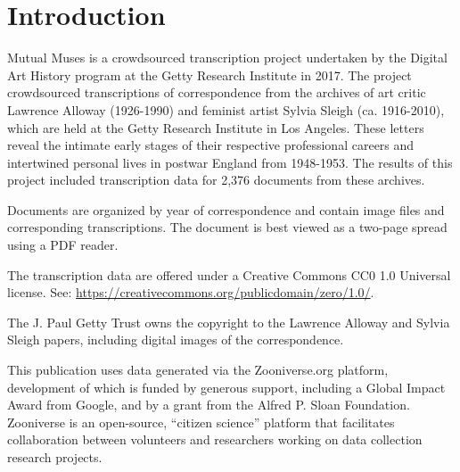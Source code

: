 \makeatletter
\renewcommand*\cleardoublepage{\clearpage\if@twoside
  \ifodd\c@page \hbox{}\newpage\if@twocolumn\hbox{}%
  \newpage\fi\fi\fi}
\makeatother

\chapter*{Introduction}

Mutual Muses is a crowdsourced transcription project undertaken by the Digital Art History program at the Getty Research Institute in 2017. The project crowdsourced transcriptions of correspondence from the archives of art critic Lawrence Alloway (1926-1990) and feminist artist Sylvia Sleigh (ca. 1916-2010), which are held at the Getty Research Institute in Los Angeles. These letters reveal the intimate early stages of their respective professional careers and intertwined personal lives in postwar England from 1948-1953. The results of this project included transcription data for 2,376 documents from these archives.

Documents are organized by year of correspondence and contain image files and corresponding transcriptions. The document is best viewed as a two-page spread using a PDF reader.

The transcription data are offered under a Creative Commons CC0 1.0 Universal license. See: \url{https://creativecommons.org/publicdomain/zero/1.0/}.

The J. Paul Getty Trust owns the copyright to the Lawrence Alloway and Sylvia Sleigh papers, including digital images of the correspondence.

This publication uses data generated via the Zooniverse.org platform, development of which is funded by generous support, including a Global Impact Award from Google, and by a grant from the Alfred P. Sloan Foundation. Zooniverse is an open-source, ``citizen science'' platform that facilitates collaboration between volunteers and researchers working on data collection research projects. 
